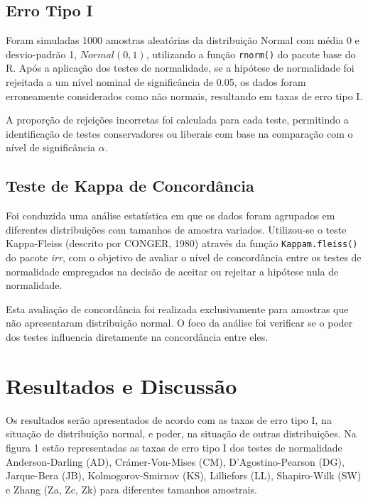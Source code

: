 \documentclass[a4paper,11pt]{article} %
\begin{document}














\subsection{Erro Tipo I}
Foram simuladas 1000 amostras aleatórias da distribuição Normal com média 0 e desvio-padrão 1, $Normal(0, 1)$, utilizando a função \texttt{rnorm()} do pacote base do R. Após a aplicação dos testes de normalidade, se a hipótese de normalidade foi rejeitada a um nível nominal de significância de 0.05, os dados foram erroneamente considerados como não normais, resultando em taxas de erro tipo I. \vskip0.3cm

A proporção de rejeições incorretas foi calculada para cada teste, permitindo a identificação de testes conservadores ou liberais com base na comparação com o nível de significância $\alpha$.

\subsection{Teste de Kappa de Concordância}
Foi conduzida uma análise estatística em que os dados foram agrupados em diferentes distribuições com tamanhos de amostra variados. Utilizou-se o teste Kappa-Fleiss (descrito por CONGER, 1980) através da função \texttt{Kappam.fleiss()} do pacote \textit{irr}, com o objetivo de avaliar o nível de concordância entre os testes de normalidade empregados na decisão de aceitar ou rejeitar a hipótese nula de normalidade. \vskip0.3cm

Esta avaliação de concordância foi realizada exclusivamente para amostras que não apresentaram distribuição normal. O foco da análise foi verificar se o poder dos testes influencia diretamente na concordância entre eles.


\section{Resultados e Discussão}
Os resultados serão apresentados de acordo com as taxas de erro tipo I, na situação de distribuição normal, e poder, na situação de outras distribuições. Na figura 1 estão representadas as taxas de erro tipo I dos testes de normalidade Anderson-Darling (AD), Crámer-Von-Mises (CM), D’Agostino-Pearson (DG), Jarque-Bera (JB), Kolmogorov-Smirnov (KS), Lilliefors (LL), Shapiro-Wilk (SW) e Zhang (Za, Zc, Zk) para diferentes tamanhos amostrais. \vskip0.3cm
\end{document}
